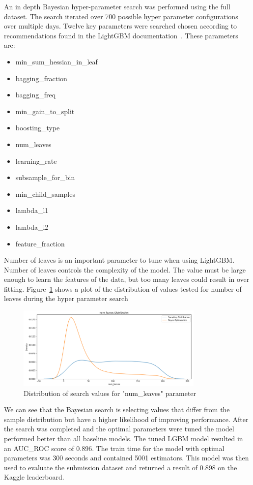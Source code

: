 \documentclass[journal,twoside,web]{ieeecolor}
\begin{document}
An in depth Bayesian hyper-parameter search was performed using the full dataset. The search iterated over 700 possible hyper parameter configurations over multiple days. Twelve key parameters were searched chosen according to recommendations found in the LightGBM documentation~\cite{lightgbm_documentation}. These parameters are:
\begin{itemize}
\item min\_sum\_hessian\_in\_leaf
\item bagging\_fraction
\item bagging\_freq
\item min\_gain\_to\_split
\item boosting\_type
\item num\_leaves
\item learning\_rate
\item subsample\_for\_bin
\item min\_child\_samples
\item lambda\_l1
\item lambda\_l2
\item feature\_fraction
\end{itemize}

Number of leaves is an important parameter to tune when using LightGBM. Number of leaves controls the complexity of the model. The value must be large enough to learn the features of the data, but too many leaves could result in over fitting. Figure~\ref{fig:lgbmtuning_numleaves} shows a plot of the distribution of values tested for number of leaves during the hyper parameter search

\begin{figure}[h!]
  \centering
  \includegraphics[width=3.6in]{project/code/results/num-leaves-distplot.png}
  \caption{Distribution of search values for "num\_leaves" parameter}
  \label{fig:lgbmtuning_numleaves}
\end{figure}

We can see that the Bayesian search is selecting values that differ from the sample distribution but have a higher likelihood of improving performance. After the search was completed and the optimal parameters were tuned the model performed better than all baseline models. The tuned LGBM model resulted in an AUC\_ROC score of 0.896. The train time for the model with optimal parameters was 300 seconds and contained 5001 estimators. This model was then used to evaluate the submission dataset and returned a result of 0.898 on the Kaggle leaderboard.
\end{document}

